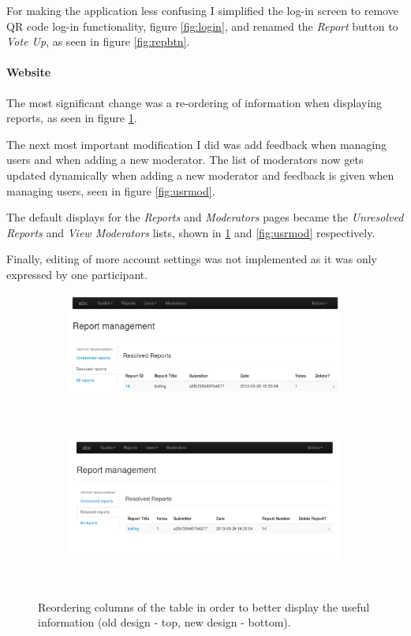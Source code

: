 \documentclass[12pt]{ecsproject}     %
\begin{document}
For making the application less confusing I simplified the log-in screen to remove QR code log-in functionality, figure \ref{fig:login}, and renamed the \textit{Report} button to \textit{Vote Up}, as seen in figure \ref{fig:repbtn}.

\paragraph{Website}
The most significant change was a re-ordering of information when displaying reports, as seen in figure \ref{fig:reportstable}.

The next most important modification I did was add feedback when managing users and when adding a new moderator. The list of moderators now gets updated dynamically when adding a new moderator and feedback is given when managing users, seen in figure \ref{fig:usrmod}.

The default displays for the \textit{Reports} and \textit{Moderators} pages became the \textit{Unresolved Reports} and \textit{View Moderators} lists, shown in \ref{fig:reportstable} and \ref{fig:usrmod} respectively.

Finally, editing of more account settings was not implemented as it was only expressed by one participant.

\begin{figure}
\centering
	\begin{subfigure}
	\centering	
	\includegraphics[scale=0.4]{resolved-old.png}
	\end{subfigure}
	~
	\begin{subfigure}
	\centering	
	\includegraphics[scale=0.4]{order-new.png}
	\end{subfigure}
	~
	\caption{Reordering columns of the table in order to better display the useful information (old design - top, new design - bottom).}	
\label{fig:reportstable}
\end{figure}
\end{document}
